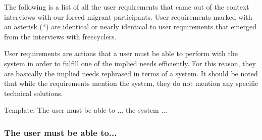 The following is a list of all the user requirements that came out of the context interviews with our forced migrant participants. User requirements marked with an asterisk (*) are identical or nearly identical to user requirements that emerged from the interviews with freecyclers.

User requirements are actions that a user must be able to perform with the system in order to fulfill one of the implied needs efficiently. For this reason, they are basically the implied needs rephrased in terms of a system. It should be noted that while the requirements mention the system, they do not mention any specific technical solutions.

Template: The user must be able to ... the system ...

\subsubsection*{The user must be able to...}

